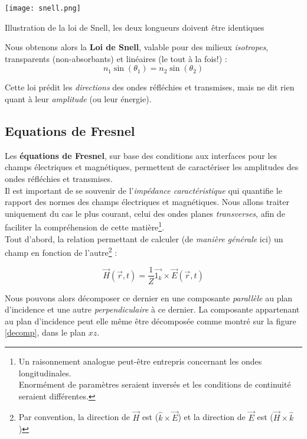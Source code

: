 \begin{marginfigure}
\texttt{[image: snell.png]}
\caption{Illustration de la loi de Snell, les deux longueurs doivent être identiques}
\end{marginfigure}

Nous obtenons alors la \textbf{Loi de Snell}, valable pour des milieux \textit{isotropes}, transparents (non-absorbants) et linéaires (le tout à la fois!) :
\[ n_{1} \sin(\theta_{1}) = n_{2} \sin(\theta_{2})\]

Cette loi prédit les \textit{directions} des ondes réfléchies et transmises, mais ne dit rien quant à leur \textsl{amplitude} (ou leur énergie). 

\subsection{Equations de Fresnel}

Les \textbf{équations de Fresnel}, sur base des conditions aux interfaces pour les champs électriques et magnétiques, permettent de caractériser les amplitudes des ondes réfléchies et transmises. \\ 
Il est important de se souvenir de l'\textit{impédance caractéristique} qui quantifie le rapport des normes des champs électriques et magnétiques. Nous allons traiter uniquement du cas le plus courant, celui des ondes planes \textit{transverses}, afin de faciliter la compréhension de cette matière\footnote{Un raisonnement analogue peut-être entrepris concernant les ondes longitudinales. \\Enormément de paramètres seraient inversés et les conditions de continuité seraient différentes.}. \\

Tout d'abord, la relation permettant de calculer (de \textit{manière générale} ici) un champ en fonction de l'autre\footnote{Par convention, la direction de $\vec{H}$ est ($\hat{k} \times \vec{E}$) et la direction de $\vec{E}$ est 
($ \vec{H} \times \hat{k}$) } : 

\[\vec{H}(\vec{r},t) = \frac{1}{Z}\vec{1_k} \times \vec{E}(\vec{r},t) \]%

Nous pouvons alors décomposer ce dernier en une composante \textit{parallèle} au plan d'incidence et une autre \textit{perpendiculaire} à ce dernier. La composante appartenant au plan d'incidence peut elle même être décomposée comme montré sur la figure \ref{decomp}, dans le plan $xz$.\\ 

